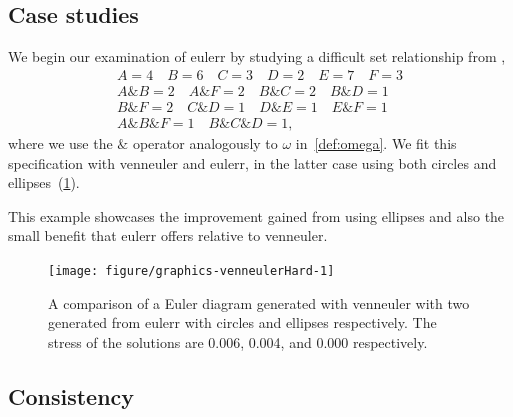 \documentclass[
  a4paper,
  nofonts,
  nobib,
  titlepage,
  justified,
  marginals=raggedouter,
  nohyper
]{tufte-handout}\usepackage[]{graphicx}\usepackage[]{color}
\newenvironment{knitrout}{}{} %
\newcommand{\pkg}[1]{{\fontseries{b}\selectfont #1}}
\begin{document}
\subsection{Case studies}
\label{sec:caseStudies}

We begin our examination of \pkg{eulerr} by studying a difficult set
relationship from \citet{wilkinson_2012},
\begin{gather*}
A = 4 \quad B = 6 \quad C = 3 \quad D = 2 \quad E = 7 \quad F = 3\\
A\& B = 2 \quad A\&F = 2 \quad B\& C = 2 \quad B\&D = 1 \\
B\& F = 2 \quad C\&D = 1 \quad D\& E = 1 \quad E\&F = 1 \\
A\&B\&F = 1 \quad B\&C\&D = 1,\end{gather*}
where we use the $\&$ operator analogously to $\omega$ in~\cref{def:omega}. We
fit this specification with \pkg{venneuler} and \pkg{eulerr}, in the latter
case using both circles and ellipses~(\cref{fig:venneulerHard}).

This example showcases the improvement gained from using ellipses and also the
small benefit that \pkg{eulerr} offers relative to \pkg{venneuler}.

\begin{figure}[hbtp!]%
\begin{knitrout}
\color{fgcolor}

{\centering \texttt{[image: figure/graphics-venneulerHard-1]} 

}



\end{knitrout}
\label{fig:venneulerHard}
\caption{A comparison of a Euler diagram generated with \pkg{venneuler} with two generated from \pkg{eulerr} with circles and ellipses respectively. The stress of the solutions are 0.006, 0.004, and 0.000 respectively.}
\end{figure}

\subsection{Consistency}
\label{sec:consistency}
\end{document}
